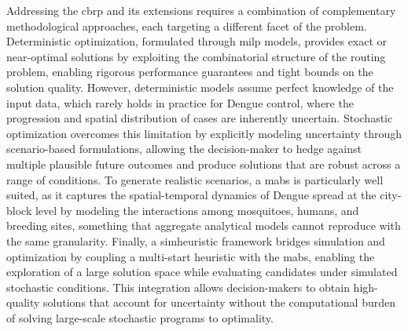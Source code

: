 Addressing the \gls{cbrp} and its extensions requires a combination of
complementary methodological approaches, each targeting a different facet of the
problem. Deterministic optimization, formulated through \gls{milp} models,
provides exact or near-optimal solutions by exploiting the combinatorial
structure of the routing problem, enabling rigorous performance guarantees and
tight bounds on the solution quality. However, deterministic models assume
perfect knowledge of the input data, which rarely holds in practice for Dengue
control, where the progression and spatial distribution of cases are inherently
uncertain. Stochastic optimization overcomes this limitation by explicitly
modeling uncertainty through scenario-based formulations, allowing the
decision-maker to hedge against multiple plausible future outcomes and produce
solutions that are robust across a range of conditions. To generate realistic
scenarios, a \gls{mabs} is particularly well suited, as it captures the
spatial-temporal dynamics of Dengue spread at the city-block level by modeling
the interactions among mosquitoes, humans, and breeding sites, something that
aggregate analytical models cannot reproduce with the same granularity. Finally,
a simheuristic framework bridges simulation and optimization by coupling a
multi-start heuristic with the \gls{mabs}, enabling the exploration of a large
solution space while evaluating candidates under simulated stochastic conditions.
This integration allows decision-makers to obtain high-quality solutions that
account for uncertainty without the computational burden of solving large-scale
stochastic programs to optimality.

